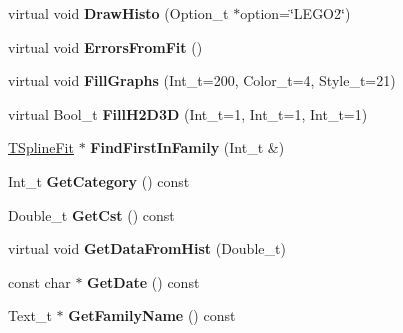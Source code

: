 \begin{DoxyCompactItemize}
\item 
\hypertarget{classTSplineFit_ac165f11e489be797967a3a3f07e3e133}{
virtual void {\bfseries DrawHisto} (Option\_\-t $\ast$option=\char`\"{}LEGO2\char`\"{})}
\label{classTSplineFit_ac165f11e489be797967a3a3f07e3e133}

\item 
\hypertarget{classTSplineFit_aac3ea52e6f8d99e7f284b94179b373cd}{
virtual void {\bfseries ErrorsFromFit} ()}
\label{classTSplineFit_aac3ea52e6f8d99e7f284b94179b373cd}

\item 
\hypertarget{classTSplineFit_abc4a412ff1be51b1def319603d0e34c4}{
virtual void {\bfseries FillGraphs} (Int\_\-t=200, Color\_\-t=4, Style\_\-t=21)}
\label{classTSplineFit_abc4a412ff1be51b1def319603d0e34c4}

\item 
\hypertarget{classTSplineFit_aa2eab2f0febea98a7fc9c2e9d1ee1297}{
virtual Bool\_\-t {\bfseries FillH2D3D} (Int\_\-t=1, Int\_\-t=1, Int\_\-t=1)}
\label{classTSplineFit_aa2eab2f0febea98a7fc9c2e9d1ee1297}

\item 
\hypertarget{classTSplineFit_a5f1d719a36f7302604ae9b3213c75930}{
\hyperlink{classTSplineFit}{TSplineFit} $\ast$ {\bfseries FindFirstInFamily} (Int\_\-t \&)}
\label{classTSplineFit_a5f1d719a36f7302604ae9b3213c75930}

\item 
\hypertarget{classTSplineFit_a224253ef07908dcd62013fc86efb8822}{
Int\_\-t {\bfseries GetCategory} () const }
\label{classTSplineFit_a224253ef07908dcd62013fc86efb8822}

\item 
\hypertarget{classTSplineFit_abf9fe6c11991905b56a1265311cbac4f}{
Double\_\-t {\bfseries GetCst} () const }
\label{classTSplineFit_abf9fe6c11991905b56a1265311cbac4f}

\item 
\hypertarget{classTSplineFit_ababceaec1005f76d942e5496234aa59d}{
virtual void {\bfseries GetDataFromHist} (Double\_\-t)}
\label{classTSplineFit_ababceaec1005f76d942e5496234aa59d}

\item 
\hypertarget{classTSplineFit_aff467a42084370a79fb4d2580944f9d3}{
const char $\ast$ {\bfseries GetDate} () const }
\label{classTSplineFit_aff467a42084370a79fb4d2580944f9d3}

\item 
\hypertarget{classTSplineFit_ad692f4353135dc5ae5c98f1d496a5c5c}{
Text\_\-t $\ast$ {\bfseries GetFamilyName} () const }
\label{classTSplineFit_ad692f4353135dc5ae5c98f1d496a5c5c}


\end{DoxyCompactItemize}
